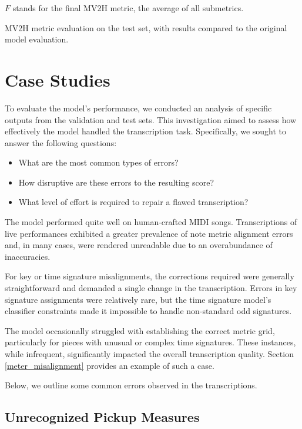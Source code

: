 $F$ stands for the final MV2H metric, the average of all submetrics.

\begin{table}[ht!]
\centering

\caption[MV2H metric evaluation on the test set.]{MV2H metric evaluation on the test set, with results compared to the original model evaluation.}
\end{table}

\section{Case Studies}

To evaluate the model’s performance, we conducted an analysis of specific outputs from the validation and test sets. This investigation aimed to assess how effectively the model handled the transcription task. Specifically, we sought to answer the following questions:
\begin{itemize} 
	\item What are the most common types of errors?
	\item How disruptive are these errors to the resulting score?
	\item What level of effort is required to repair a flawed transcription?
\end{itemize}

The model performed quite well on human-crafted MIDI songs. Transcriptions of live performances exhibited a greater prevalence of note metric alignment errors and, in many cases, were rendered unreadable due to an overabundance of inaccuracies.

For key or time signature misalignments, the corrections required were generally straightforward and demanded a single change in the transcription. Errors in key signature assignments were relatively rare, but the time signature model's classifier constraints made it impossible to handle non-standard odd signatures. 

The model occasionally struggled with establishing the correct metric grid, particularly for pieces with unusual or complex time signatures. These instances, while infrequent, significantly impacted the overall transcription quality. Section \ref{meter_misalignment} provides an example of such a case.

Below, we outline some common errors observed in the transcriptions.

\subsection{Unrecognized Pickup Measures}

